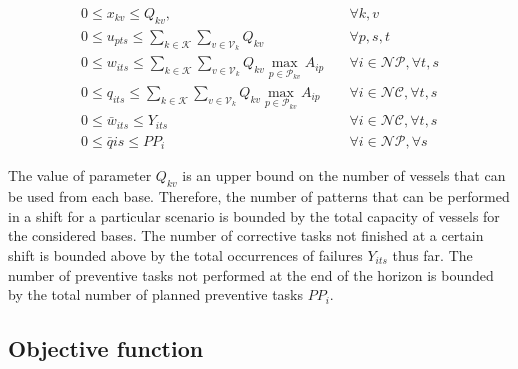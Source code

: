 \begin{align}
\label{eq:bound1}
  0 \leq x_{kv} \leq Q_{kv},				&\quad	\forall k,v\\
\label{eq:bound2}
  0 \leq u_{pts} \leq \sum\limits_{k\in\mathcal{K}} \sum\limits_{v\in\mathcal{V}_k} Q_{kv} &\quad \forall p,s,t  \\
\label{eq:bound3}
0 \leq w_{its} \leq \sum\limits_{k\in\mathcal{K}} \sum\limits_{v\in\mathcal{V}_k} Q_{kv}\max\limits_{p\in \mathcal{P}_{kv}}A_{ip} 	&\quad \forall i \in \mathcal{NP}, \forall t,s\\
\label{eq:bound4}  	
0 \leq q_{its} \leq \sum\limits_{k\in\mathcal{K}} \sum\limits_{v\in\mathcal{V}_k} Q_{kv}\max\limits_{p\in \mathcal{P}_{kv}}A_{ip} 	&\quad \forall i \in \mathcal{NC}, \forall t,s\\
\label{eq:bound5}
  0 \leq \bar{w}_{its}\leq Y_{i ts} &\quad	\forall i\in\mathcal{NC}, \forall t,s\\
\label{eq:bound6}
   0 \leq \bar{q}{is}\leq PP_{i} &\quad	\forall i\in\mathcal{NP}, \forall s
\end{align}



The value of parameter $Q_{kv}$ is an upper bound on the number of vessels that can be used from each base. Therefore, the number of patterns that can be performed in a shift for a particular scenario is bounded by the total capacity of vessels for the considered bases. The number of corrective tasks not finished at a certain shift is bounded above by the total occurrences of failures $Y_{its}$ thus far.
The number of preventive tasks not performed at the end of the horizon is bounded by the total number of planned preventive tasks $PP_i$. 


\subsection{Objective function}

